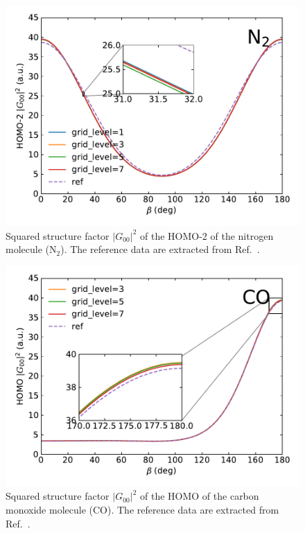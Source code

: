 \documentclass[preprint,12pt]{elsarticle} %
\renewcommand{\rm}[1]{\mathrm{#1}}    %
\newcommand{\abs}[1]{\lvert #1 \rvert}  %
\begin{document}
\begin{figure}[tb]
    \centering
    \includegraphics[width=\columnwidth]{N2_ConvTest_sub_20230226.pdf}
    \caption{Squared structure factor $\abs{G_{00}}^2$ of the HOMO-2 of the nitrogen molecule ($\rm{N}_2$). The reference data are extracted from Ref.~\cite{saito_structure_2015}.}
    \label{fig:convtest_N2}
\end{figure}

\begin{figure}[tb]
    \centering
    \includegraphics[width=\columnwidth]{CO_ConvTest_sub_20230226.pdf}
    \caption{Squared structure factor $\abs{G_{00}}^2$ of the HOMO of the carbon monoxide molecule ($\rm{CO}$). The reference data are extracted from Ref.~\cite{saito_structure_2015}.}
    \label{fig:convtest_CO}
\end{figure}
\end{document}
